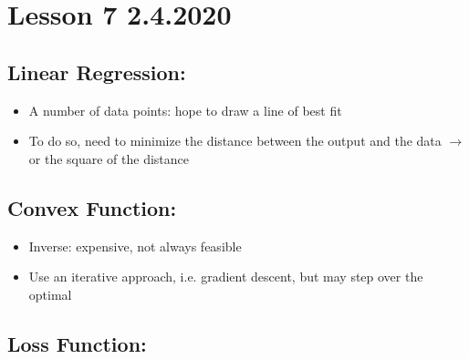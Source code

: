 \documentclass[11pt,letterpaper,titlepage]{article}
\begin{document}
\newpage

\section{Lesson 7 2.4.2020}

\subsection{Linear Regression:}

\begin{itemize}

    \item A number of data points: hope to draw a line of best fit
    
    \item To do so, need to minimize the distance between the output and the data $\rightarrow$ or the square of the distance
    
\end{itemize}

\subsection{Convex Function:}

\begin{itemize}
    
    \item Inverse: expensive, not always feasible
    
    \item Use an iterative approach, i.e. gradient descent, but may step over the optimal
    
\end{itemize}

\subsection{Loss Function:}
\end{document}
